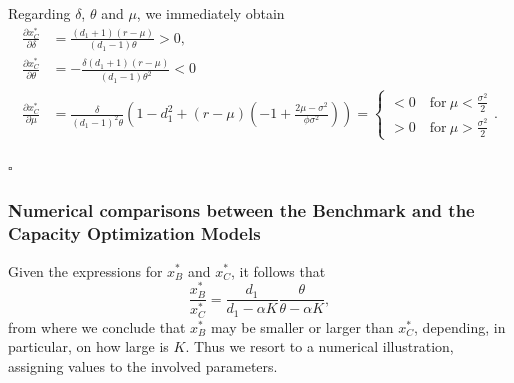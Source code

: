 Regarding $\delta$, $\theta$ and $\mu$, we immediately obtain 
\begin{align*}
\frac{\partial x^*_C}{\partial \delta}&=\frac{(d_1+1) (r-\mu )}{(d_1-1) \theta }>0,\\
\frac{\partial x^*_C}{\partial \theta}&=-\frac{\delta  (d_1+1) (r-\mu )}{(d_1-1) \theta^2}<0\\
\frac{\partial x^*_C}{\partial \mu}&=\frac{\delta}{(d_1-1)^2 \theta} \left( 1-d_1^2 +(r-\mu)\left(-1+\frac{2\mu-\sigma^2}{\phi \sigma^2} \right) \right)= \begin{cases}
<0 \quad \text{for} \ \mu<\frac{\sigma^2}{2}\\
>0 \quad \text{for} \ \mu>\frac{\sigma^2}{2}
\end{cases}.
\end{align*}

\begin{flushright}
 $\square$
\end{flushright}


\subsubsection{Numerical comparisons between the Benchmark and the Capacity Optimization Models}



Given the expressions for $x^*_B$ and $x^*_C$, it follows that
$$ \frac{x^*_B}{x^*_C}=\frac{d_1}{d_1-\alpha K} \frac{\theta}{\theta-\alpha K},$$
from where we conclude that $x^*_B$ may be smaller or larger than $x^*_C$, depending, in particular, on how large is $K$. Thus we resort to a numerical illustration, assigning values to the involved parameters.

